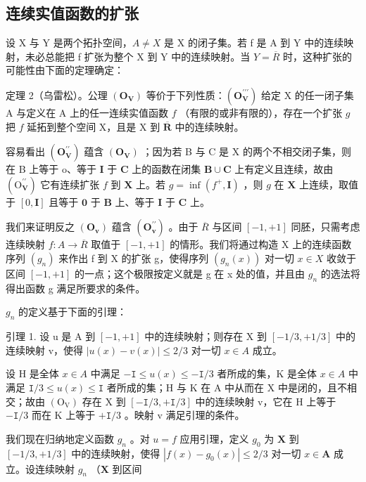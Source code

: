 \subsection{连续实值函数的扩张}

设 X 与 Y 是两个拓扑空间，\(A \neq X\) 是 X 的闭子集。若 f 是 A 到 Y 中的连续映射，未必总能把 f 扩张为整个 X 到 Y 中的连续映射。当 \(Y = \overline{R}\) 时，这种扩张的可能性由下面的定理确定：

定理 2（乌雷松）。公理 \((\mathbf{O}_{\mathbf{V}})\) 等价于下列性质：\((\mathbf{O}_{\mathbf{V}}^{\prime \prime \prime})\) 给定 X 的任一闭子集 A 与定义在 A 上的任一连续实值函数 \(f\) （有限的或非有限的），存在一个扩张 \(g\) 把 \(f\) 延拓到整个空间 X，且是 X 到 \(\overline{\mathbf{R}}\) 中的连续映射。

容易看出 \((\mathbf{O}_{\mathbf{V}}^{\prime\prime})\) 蕴含 \((\mathbf{O}_{\mathbf{V}})\) ；因为若 B 与 C 是 X 的两个不相交闭子集，则在 B 上等于 o、等于 \(\mathbf{I}\) 于 \(\mathbf{C}\) 上的函数在闭集 \(\mathbf{B} \cup \mathbf{C}\) 上有定义且连续，故由 \((\mathrm{O}_{\mathbf{V}}^{\prime \prime})\) 它有连续扩张 \(f\) 到 \(\mathbf{X}\) 上。若 \(g = \inf (f^{+}, \mathbf{I})\) ，则 \(g\) 在 \(\mathbf{X}\) 上连续，取值于 \([0, \mathbf{I}]\) 且等于 \(\mathbf{0}\) 于 \(\mathbf{B}\) 上、等于 \(\mathbf{I}\) 于 \(\mathbf{C}\) 上。

我们来证明反之 \((\mathbf{O}_{\mathbf{v}})\) 蕴含 \((\mathbf{O}_{\mathbf{v}}^{\prime\prime})\) 。由于 \(\overline{R}\) 与区间 \([-1, +1]\) 同胚，只需考虑连续映射 \(f: A \to \overline{R}\) 取值于 \([-1, +1]\) 的情形。我们将通过构造 X 上的连续函数序列 \((g_{n})\) 来作出 f 到 X 的扩张 g，使得序列 \((g_{n}(x))\) 对一切 \(x \in X\) 收敛于区间 \([-1, +1]\) 的一点；这个极限按定义就是 g 在 x 处的值，并且由 \(g_{n}\) 的选法将得出函数 g 满足所要求的条件。

\(g_{n}\) 的定义基于下面的引理：

引理 1. 设 u 是 A 到 \([-1, +1]\) 中的连续映射；则存在 X 到 \([-1/3, +1/3]\) 中的连续映射 v，使得 \(|u(x) - v(x)| \leqslant 2/3\) 对一切 \(x \in A\) 成立。

设 H 是全体 \(x \in A\) 中满足 \(-\mathtt{I} \leqslant u(x) \leqslant -\mathtt{I}/3\) 者所成的集，K 是全体 \(x \in A\) 中满足 \(\mathtt{I}/3 \leqslant u(x) \leqslant \mathtt{I}\) 者所成的集；H 与 K 在 A 中从而在 X 中是闭的，且不相交；故由 \((\mathrm{O}_{\mathrm{V}})\) 存在 X 到 \([-\mathtt{I}/3, +\mathtt{I}/3]\) 中的连续映射 v，它在 H 上等于 \(-\mathtt{I}/3\) 而在 K 上等于 \(+\mathtt{I}/3\) 。映射 v 满足引理的条件。

我们现在归纳地定义函数 \(g_n\) 。对 \(u = f\) 应用引理，定义 \(g_0\) 为 \(\mathbf{X}\) 到 \([-1/3, +1/3]\) 中的连续映射，使得 \(|f(x) - g_0(x)| \leqslant 2/3\) 对一切 \(x \in \mathbf{A}\) 成立。设连续映射 \(g_n\) （\(\mathbf{X}\) 到区间

